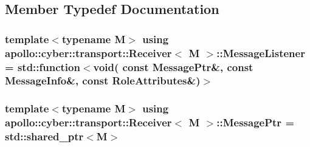 \subsection{Member Typedef Documentation}
\hypertarget{classapollo_1_1cyber_1_1transport_1_1Receiver_abd906fd03582b49acbdc81b48a8974aa}{
\subsubsection[{Message\-Listener}]{\setlength{\rightskip}{0pt plus 5cm}template$<$typename M$>$ using {\bf apollo\-::cyber\-::transport\-::\-Receiver}$<$ M $>$\-::{\bf Message\-Listener} =  std\-::function$<$void( const {\bf Message\-Ptr}\&, const {\bf Message\-Info}\&, const Role\-Attributes\&)$>$}}\label{classapollo_1_1cyber_1_1transport_1_1Receiver_abd906fd03582b49acbdc81b48a8974aa}
\hypertarget{classapollo_1_1cyber_1_1transport_1_1Receiver_af02a7bde2d210b5e2e122ba3810933d1}{
\subsubsection[{Message\-Ptr}]{\setlength{\rightskip}{0pt plus 5cm}template$<$typename M$>$ using {\bf apollo\-::cyber\-::transport\-::\-Receiver}$<$ M $>$\-::{\bf Message\-Ptr} =  std\-::shared\-\_\-ptr$<$M$>$}}\label{classapollo_1_1cyber_1_1transport_1_1Receiver_af02a7bde2d210b5e2e122ba3810933d1}


